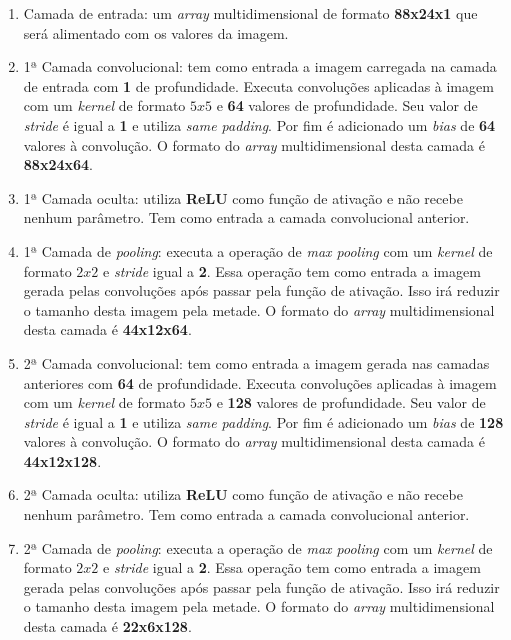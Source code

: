\begin{enumerate}

\item Camada de entrada: um \textit{array} multidimensional de formato
  {\bf 88x24x1} que será alimentado com os valores da imagem.

\item 1ª Camada convolucional: tem como entrada a imagem carregada na
  camada de entrada com {\bf 1} de profundidade. Executa convoluções
  aplicadas à imagem com um \textit{kernel} de formato $5x5$ e {\bf
    64} valores de profundidade. Seu valor de \textit{stride} é igual
  a {\bf 1} e utiliza \textit{same padding}. Por fim é adicionado um
  \textit{bias} de {\bf 64} valores à convolução. O formato do \textit{array}
  multidimensional desta camada é {\bf 88x24x64}.

\item 1ª Camada oculta: utiliza {\bf ReLU} como função de ativação e
  não recebe nenhum parâmetro. Tem como entrada a camada convolucional
  anterior.

\item 1ª Camada de \textit{pooling}: executa a operação de
  \textit{max pooling} com um \textit{kernel} de formato $2x2$ e
  \textit{stride} igual a {\bf 2}. Essa operação tem como entrada a
  imagem gerada pelas convoluções após passar pela função de
  ativação. Isso irá reduzir o tamanho desta imagem pela metade. O
  formato do \textit{array} multidimensional desta camada é {\bf 44x12x64}.

\item 2ª Camada convolucional: tem como entrada a imagem gerada
  nas camadas anteriores com {\bf 64} de profundidade. Executa
  convoluções aplicadas à imagem com um \textit{kernel} de formato
  $5x5$ e {\bf 128} valores de profundidade. Seu valor de
  \textit{stride} é igual a {\bf 1} e utiliza \textit{same
    padding}. Por fim é adicionado um \textit{bias} de {\bf 128}
  valores à convolução. O formato do \textit{array} multidimensional desta
  camada é {\bf 44x12x128}.

\item 2ª Camada oculta: utiliza {\bf ReLU} como função de ativação e
  não recebe nenhum parâmetro. Tem como entrada a camada convolucional
  anterior.

\item 2ª Camada de \textit{pooling}: executa a operação de
  \textit{max pooling} com um \textit{kernel} de formato $2x2$ e
  \textit{stride} igual a {\bf 2}. Essa operação tem como entrada a
  imagem gerada pelas convoluções após passar pela função de
  ativação. Isso irá reduzir o tamanho desta imagem pela metade. O
  formato do \textit{array} multidimensional desta camada é {\bf 22x6x128}.


\end{enumerate}

